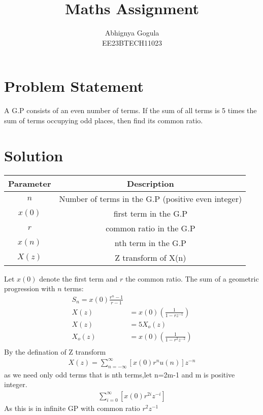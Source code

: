 \documentclass{article}
\begin{document}
\title{Maths Assignment}
\author{Abhignya Gogula\\
        EE23BTECH11023}
\maketitle
\section*{Problem Statement}
A G.P consists of an even number of terms. If the sum of all terms is 5 times the sum of terms occupying odd places, then find its common ratio.
\section*{Solution}
\begin{table}[h!]
\centering
\begin{tabular}{|c|c|}
\hline
Parameter & Description \\
\hline
\( n \) & Number of terms in the G.P (positive even integer) \\
\hline
\(x(0) \) & first term in the G.P \\
\hline
\( r \) & common ratio in the G.P \\
\hline
\( x(n) \) & nth term in the G.P \\
\hline
\( X(z) \) & Z transform of X(n) \\
\hline
\end{tabular}
\end{table}
Let \( x(0) \) denote the first term and \( r \) the common ratio. The sum of a geometric progression with \( n \) terms:
\begin{align}
 S_n = x(0) \frac{{r^n - 1}}{{r - 1}} \\
X(z) &= x(0)\left(\frac{1}{1 - rz^{-1}}\right) \\
X(z) &= 5 X_o(z) \\
X_o(z) &= x(0)\left(\frac{1}{1 - r^2z^{-2}}\right) \\
\end{align}
By the defination of Z transform 
\begin{align}
X(z)= \sum_{n=-\infty}^{\infty} [x(0)r^{n}u(n)]z^{-n}
\end{align}
as we need only odd terms that is nth terms,let n=2m-1 and m is positive integer.
\begin{align}
\sum_{i=0}^{\infty} [x(0)r^{2i}z^{-i}]
\end{align}
As this is in infinite GP with common ratio $r^{2}z^{-1}$\\
\end{document}
